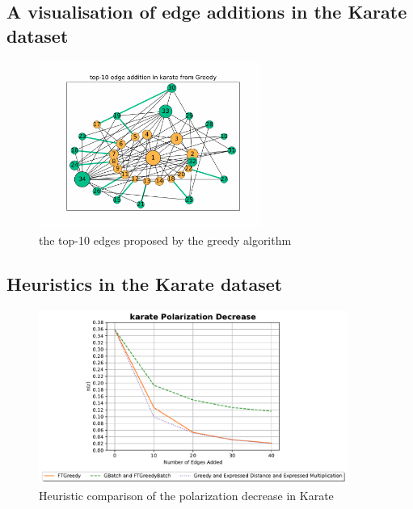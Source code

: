 \vspace{20pt}

\subsection{A visualisation of edge additions in  the Karate dataset}

\vspace{20pt}

\begin{figure}[!htbp]
	\centering
	\captionsetup{justification=centering,margin=2cm}
	\includegraphics[width=0.65\textwidth]{Figures/top-10_karate_greedy}
	\vspace{20pt}
	\caption{the top-10 edges proposed by the greedy algorithm}
	\label{fig:top-10-karate}
\end{figure}

\clearpage


\subsection{Heuristics in the Karate dataset}


\begin{figure}[!htbp]
	\centering
	\captionsetup{justification=centering,margin=2cm}
	\includegraphics[width=0.90\textwidth]{Figures/Karate Polarization Decrease}
	\caption{Heuristic comparison of the polarization decrease in Karate}
	\label{fig:karate_pol}
\end{figure}

